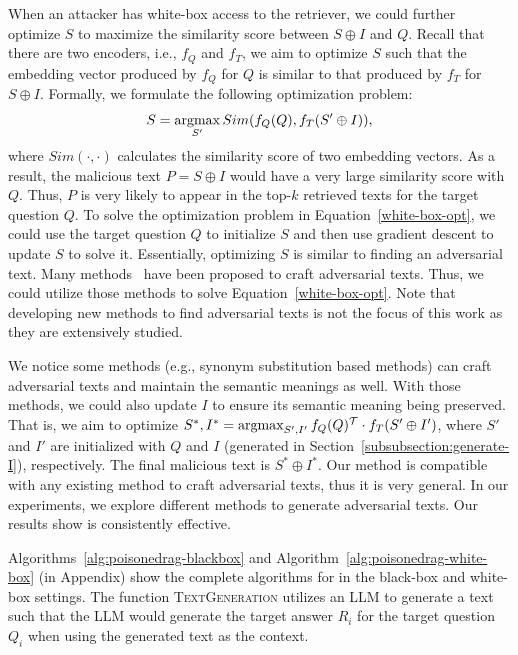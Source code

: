 When an attacker has white-box access to the retriever, we could further optimize $S$ to maximize the similarity score between $S \oplus I$ and $Q$.  Recall that there are two encoders, i.e., $f_Q$ and $f_T$, we aim to optimize $S$ such that the embedding vector produced by  $f_Q$ for $Q$ is similar to that produced by $f_T$ for $S \oplus I$. Formally, we formulate the following optimization problem:
\begin{align}
\label{white-box-opt}
    S = \argmax_{S'} Sim(f_{Q}(Q), f_{T}(S' \oplus I)),
\end{align}
where $Sim(\cdot, \cdot)$ calculates the similarity score of two embedding vectors.
As a result, the malicious text $P=S\oplus I$ would have a very large similarity score with $Q$. Thus, $P$ is very likely to appear in the top-$k$ retrieved texts for the target question $Q$. To solve the optimization problem in Equation~\ref{white-box-opt}, we could use the target question $Q$ to initialize $S$ and then use gradient descent to update $S$ to solve it. Essentially, optimizing $S$ is similar to finding an adversarial text. Many methods~\cite{morris2020textattack,ebrahimi2018hotflip,jin2020bert,li2019textbugger,li2020bert,gao2018black} have been proposed to craft adversarial texts. Thus, we could utilize those methods 
to solve 
Equation~\ref{white-box-opt}. Note that developing new methods to find adversarial texts is not the focus of this work as they are extensively studied.

We notice some methods (e.g., synonym substitution based methods) can craft adversarial texts and maintain the semantic meanings as well. With those methods, we could also update $I$ to ensure its semantic meaning being preserved. 
That is, we aim to optimize $S^*, I^* = \argmax_{S', I'} f_{Q}(Q)^{\mathcal{T}}\cdot f_{T}(S' \oplus I')$,  where $S'$ and $I'$ are initialized with $Q$ and $I$ (generated in Section~\ref{subsubsection:generate-I}), respectively. The final malicious text is $S^* \oplus I^*$. 
Our method is compatible with any existing method to craft adversarial texts, thus it is very general.
In our experiments, we explore different methods to generate adversarial texts. Our results show {\name} is consistently effective. 





 Algorithms~\ref{alg:poisonedrag-blackbox} and Algorithm~\ref{alg:poisonedrag-white-box} (in Appendix) 
show the complete algorithms for {\name} in the black-box and white-box settings. The function \textsc{TextGeneration} utilizes an LLM to generate a text such that the LLM would generate the target answer $R_i$ for the target question $Q_i$ when using the generated text as the context. 


